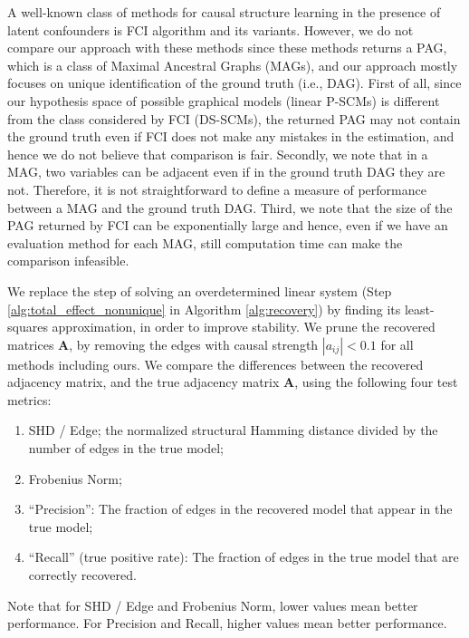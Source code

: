 \documentclass[12pt]{article}
\newcommand{\bA}{\mathbf{A}}
\begin{document}
A well-known class of methods for causal structure learning in the presence of latent confounders is FCI algorithm \citep{spirtes2000causation} and its variants. However, we do not compare our approach with these methods since these methods returns a PAG, which is a class of Maximal Ancestral Graphs (MAGs), and our approach mostly focuses on unique identification of the ground truth (i.e., DAG). First of all, since our hypothesis space of possible graphical models (linear P-SCMs) is different from the class considered by FCI (DS-SCMs), the returned PAG may not contain the ground truth even if FCI does not make any mistakes in the estimation, and hence we do not believe that comparison is fair. Secondly, we note that in a MAG, two variables can be adjacent even if in the ground truth DAG they are not. Therefore, it is not straightforward to define a measure of performance between a MAG and the ground truth DAG. Third, we note that the size of the PAG returned by FCI can be exponentially large and hence, even if we have an evaluation method for each MAG, still computation time can make the comparison infeasible.

We replace the step of solving an overdetermined linear system (Step \ref{alg:total_effect_nonunique} in Algorithm \ref{alg:recovery}) by finding its least-squares approximation, in order to improve stability. We prune the recovered matrices $\bA$, by removing the edges with causal strength $|a_{ij}|< 0.1$ for all methods including ours. We compare the differences between the recovered adjacency matrix, and the true adjacency matrix $\bA$, using the following four test metrics: 
\begin{enumerate}[(1)]
    \item SHD / Edge; the normalized structural Hamming distance divided by the number of edges in the true model;
    \item Frobenius Norm;
    \item ``Precision'': The fraction of edges in the recovered model that appear in the true model;
    \item ``Recall'' (true positive rate): The fraction of edges in the true model that are correctly recovered.
\end{enumerate}
Note that for SHD / Edge and Frobenius Norm, lower values mean better performance. For Precision and Recall, higher values mean better performance.
\end{document}
